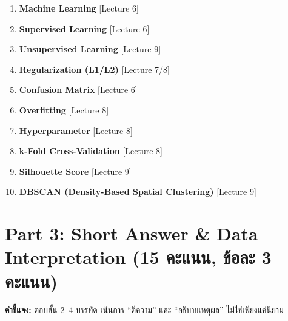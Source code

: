 \documentclass[a4paper,12pt]{article}
\begin{document}
\begin{enumerate}[label=\textbf{\arabic*.}]
    \item \textbf{Machine Learning} \hfill [Lecture 6]
    \vspace{2.2cm}

    \item \textbf{Supervised Learning} \hfill [Lecture 6]
    \vspace{2.2cm}

    \item \textbf{Unsupervised Learning} \hfill [Lecture 9]
    \vspace{2.2cm}

    \item \textbf{Regularization (L1/L2)} \hfill [Lecture 7/8]
    \vspace{2.2cm}

    \item \textbf{Confusion Matrix} \hfill [Lecture 6]
    \vspace{2.2cm}

    \item \textbf{Overfitting} \hfill [Lecture 8]
    \vspace{2.2cm}

    \item \textbf{Hyperparameter} \hfill [Lecture 8]
    \vspace{2.2cm}

    \item \textbf{k-Fold Cross-Validation} \hfill [Lecture 8]
    \vspace{2.2cm}

    \item \textbf{Silhouette Score} \hfill [Lecture 9]
    \vspace{2.2cm}

    \item \textbf{DBSCAN (Density-Based Spatial Clustering)} \hfill [Lecture 9]
    \vspace{2.2cm}
\end{enumerate}

\newpage

\section*{Part 3: Short Answer \& Data Interpretation (15 คะแนน, ข้อละ 3 คะแนน)}
\textbf{คำชี้แจง:} ตอบสั้น 2--4 บรรทัด เน้นการ ``ตีความ'' และ ``อธิบายเหตุผล'' ไม่ใช่เพียงแค่นิยาม
\end{document}
